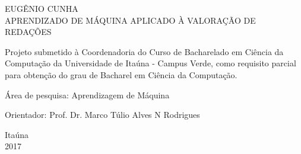 \begin{titlepage}
\vfill
\begin{center}

    {\large EUGÊNIO CUNHA\\}
    \vspace{2cm}
    {\Large \textsc{APRENDIZADO DE MÁQUINA APLICADO À VALORAÇÃO DE REDAÇÕES}\\}
    \vspace{1cm}
    \hspace{.45\linewidth}
    \begin{minipage}{.50\linewidth}

            Projeto submetido à Coordenadoria do Curso de Bacharelado 
            em Ciência da Computação da Universidade de Itaúna - Campus Verde, como requisito 
            parcial para obtenção do grau de Bacharel em Ciência da Computação.

            \vspace{0.5 cm}

            Área de pesquisa: Aprendizagem de Máquina

            \vspace{0.5 cm}

            Orientador: Prof. Dr. Marco Túlio Alves N Rodrigues
    
    \end{minipage}

    \vspace{2cm}
    \vfill
    {\large Itaúna\\ 2017}
\end{center}

\end{titlepage}